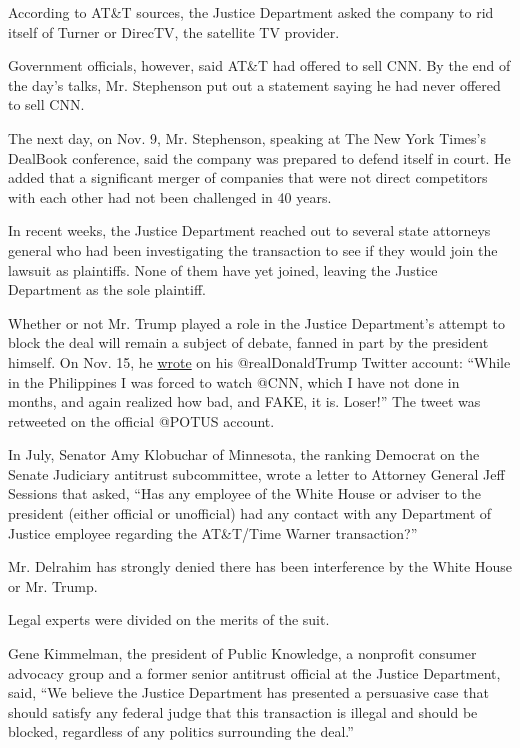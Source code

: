 According to AT\&T sources, the Justice Department asked the company to
rid itself of Turner or DirecTV, the satellite TV provider.

Government officials, however, said AT\&T had offered to sell CNN. By
the end of the day's talks, Mr. Stephenson put out a statement saying he
had never offered to sell CNN.

The next day, on Nov. 9, Mr. Stephenson, speaking at The New York
Times's DealBook conference, said the company was prepared to defend
itself in court. He added that a significant merger of companies that
were not direct competitors with each other had not been challenged in
40 years.

In recent weeks, the Justice Department reached out to several state
attorneys general who had been investigating the transaction to see if
they would join the lawsuit as plaintiffs. None of them have yet joined,
leaving the Justice Department as the sole plaintiff.

Whether or not Mr. Trump played a role in the Justice Department's
attempt to block the deal will remain a subject of debate, fanned in
part by the president himself. On Nov. 15, he
\href{https://twitter.com/realdonaldtrump/status/930748627642998784?lang=en}{wrote}
on his @realDonaldTrump Twitter account: ``While in the Philippines I
was forced to watch @CNN, which I have not done in months, and again
realized how bad, and FAKE, it is. Loser!'' The tweet was retweeted on
the official @POTUS account.

In July, Senator Amy Klobuchar of Minnesota, the ranking Democrat on the
Senate Judiciary antitrust subcommittee, wrote a letter to Attorney
General Jeff Sessions that asked, ``Has any employee of the White House
or adviser to the president (either official or unofficial) had any
contact with any Department of Justice employee regarding the AT\&T/Time
Warner transaction?''

Mr. Delrahim has strongly denied there has been interference by the
White House or Mr. Trump.

Legal experts were divided on the merits of the suit.

Gene Kimmelman, the president of Public Knowledge, a nonprofit consumer
advocacy group and a former senior antitrust official at the Justice
Department, said, ``We believe the Justice Department has presented a
persuasive case that should satisfy any federal judge that this
transaction is illegal and should be blocked, regardless of any politics
surrounding the deal.''

